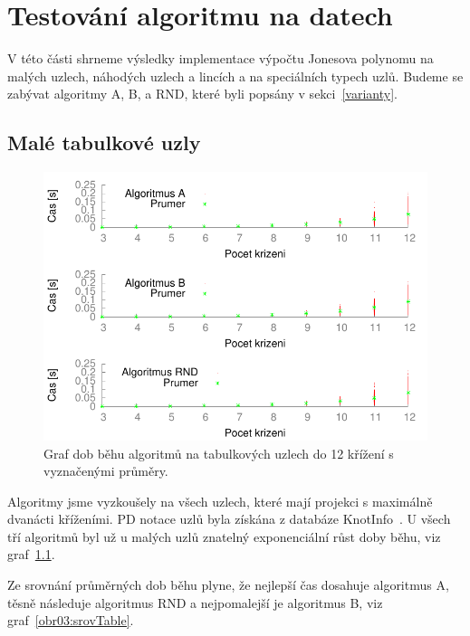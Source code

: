 
\chapter{Testování algoritmu na datech}

V této části shrneme výsledky implementace výpočtu Jonesova polynomu na malých uzlech, náhodých uzlech a lincích a na speciálních typech uzlů.
Budeme se zabývat algoritmy A, B, a RND, které byli popsány v sekci~\ref{varianty}.

\section{Malé tabulkové uzly}

\begin{figure}[p]\centering
\includegraphics{../img/multiTable}
\caption{Graf dob běhu algoritmů na tabulkových uzlech do 12 křížení s vyznačenými průměry.}
\label{obr03:multiTable}
\end{figure}

Algoritmy jsme vyzkoušely na všech uzlech, které mají projekci s maximálně dvanácti kříženími. PD notace uzlů byla získána z databáze KnotInfo~\cite{knotinfo}.
U všech tří algoritmů byl už u malých uzlů znatelný exponenciální růst doby běhu, viz graf~\ref{obr03:multiTable}. 

Ze srovnání průměrných dob běhu plyne, že nejlepší čas dosahuje algoritmus A, těsně následuje algoritmus RND a nejpomalejší je algoritmus B, viz graf~\ref{obr03:srovTable}. 
	
